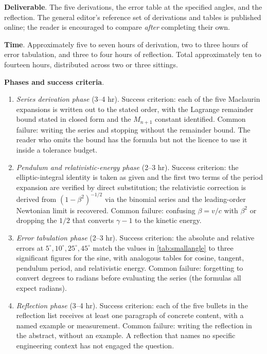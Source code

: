 \begin{project}
\textbf{Deliverable}. The five derivations, the error table at the
specified angles, and the reflection. The general editor's reference
set of derivations and tables is published online; the reader is
encouraged to compare \emph{after} completing their own.

\textbf{Time}. Approximately five to seven hours of derivation, two
to three hours of error tabulation, and three to four hours of
reflection. Total approximately ten to fourteen hours, distributed
across two or three sittings.

\textbf{Phases and success criteria}.

\begin{enumerate}[leftmargin=*]
  \item \emph{Series derivation phase} (3--4 hr). Success criterion:
    each of the five Maclaurin expansions is written out to the
    stated order, with the Lagrange remainder bound stated in
    closed form and the $M_{n+1}$ constant identified. Common
    failure: writing the series and stopping without the remainder
    bound. The reader who omits the bound has the formula but not
    the licence to use it inside a tolerance budget.
  \item \emph{Pendulum and relativistic-energy phase} (2--3 hr).
    Success criterion: the elliptic-integral identity is taken as
    given and the first two terms of the period expansion are
    verified by direct substitution; the relativistic correction
    is derived from $(1 - \beta^{2})^{-1/2}$ via the binomial
    series and the leading-order Newtonian limit is recovered.
    Common failure: confusing $\beta = v/c$ with $\beta^{2}$ or
    dropping the $1/2$ that converts $\gamma - 1$ to the kinetic
    energy.
  \item \emph{Error tabulation phase} (2--3 hr). Success criterion:
    the absolute and relative errors at $5^{\circ}, 10^{\circ},
    25^{\circ}, 45^{\circ}$ match the values in
    \autoref{tab:smallangle} to three significant figures for the
    sine, with analogous tables for cosine, tangent, pendulum
    period, and relativistic energy. Common failure: forgetting
    to convert degrees to radians before evaluating the series
    (the formulas all expect radians).
  \item \emph{Reflection phase} (3--4 hr). Success criterion: each
    of the five bullets in the reflection list receives at least
    one paragraph of concrete content, with a named example or
    measurement. Common failure: writing the reflection in the
    abstract, without an example. A reflection that names no
    specific engineering context has not engaged the question.
\end{enumerate}


\end{project}
